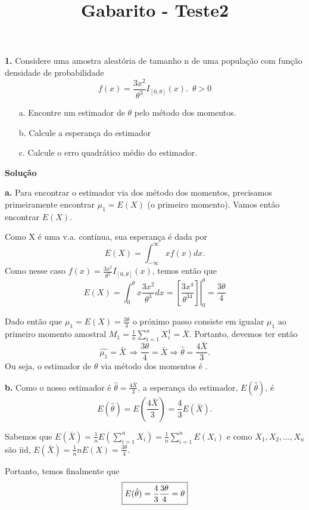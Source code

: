 \documentclass[12pt,a4paper]{article}
\title{Gabarito - Teste2}
\date{}
\begin{document}
\maketitle

\textbf{1.} Considere uma amostra aleatória de tamanho n de uma população com função densidade de probabilidade $$f(x) = \frac{3x^2}{\theta^3} I_{[0,\theta]}(x). \, \, \, \theta > 0$$

\begin{itemize}
	\item[a.] Encontre um estimador de $\theta$ pelo método dos momentos.
	\item[b.] Calcule a esperança do estimador
	\item[c.] Calcule o erro quadr\'atico m\'edio do estimador.
\end{itemize}

\textbf{Solução}
\bigskip

\textbf{a.} Para encontrar o estimador via dos método dos momentos, precisamos primeiramente encontrar $\mu_1 = E(X)$ (o primeiro momento). Vamos então encontrar $E(X)$. 

Como X é uma v.a. contínua, sua esperança é dada por $$E(X) = \int_{-\infty}^{\infty} xf(x)dx.$$ Como nesse caso $f(x) = \frac{3x^2}{\theta^3} I_{[0,\theta]}(x)$, temos então que $$E(X) = \int_{0}^{\theta} x\frac{3x^2}{\theta^3}dx = \left.\left[\frac{3x^4}{\theta^34}\right]\right|_{0}^{\theta} = \frac{3\theta}{4}$$

Dado então que $\mu_1 = E(X) = \frac{3\theta}{4}$ o próximo passo consiste em igualar $\mu_1$ ao primeiro momento amostral $M_1 = \frac{1}{n}\sum_{i=1}^n X_i^1 = \bar{X}$. Portanto, devemos ter então $$\hat{\mu_1} = \bar{X} \, \Rightarrow \frac{3\theta}{4}=\bar{X} \Rightarrow \hat{\theta} = \frac{4\bar{X}}{3}.$$ Ou seja, o estimador de $\theta$ via método dos momentos é .

\bigskip

\textbf{b.} Como o nosso estimador é $\hat{\theta} = \frac{4\bar{X}}{3}$, a esperança do estimador, $E(\hat{\theta})$, é $$E(\hat{\theta}) = E(\frac{4\bar{X}}{3}) = \frac{4}{3}E(\bar{X}).$$

Sabemos que $E(\bar{X}) = \frac{1}{n}E(\sum_{i=1}^nX_i) = \frac{1}{n}\sum_{i=1}^nE(X_i)$ e como $X_1, X_2, \dots, X_n$ são iid, $E(\bar{X}) = \frac{1}{n}nE(X) = \frac{3\theta}{4}$. 

Portanto, temos finalmente que $$\fbox{$E(\hat{\theta}) = \dfrac{4}{3}\dfrac{3\theta}{4} = 
\theta$}$$
\end{document}
